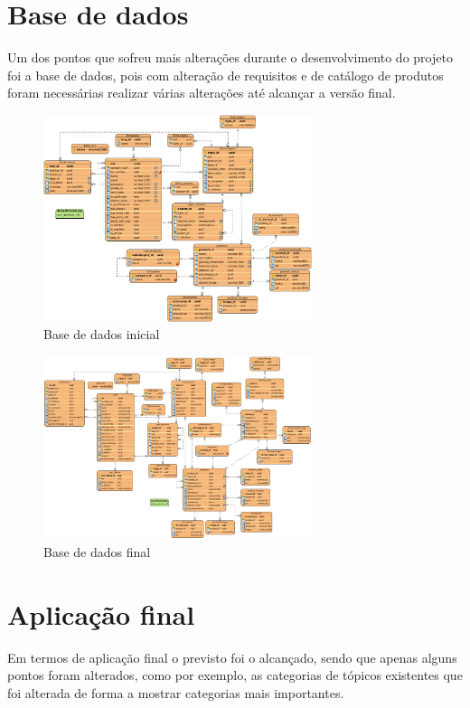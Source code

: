\section{Base de dados}

Um dos pontos que sofreu mais alterações durante o desenvolvimento do projeto foi a base de dados, pois com alteração de requisitos e de catálogo de produtos foram necessárias realizar várias alterações até alcançar a versão final.

\begin{figure}[htb]
  \centering
  \includegraphics[width=0.7\textwidth]{images/diagramas/diagrama_bd.png}
  \caption{Base de dados inicial}
  \label{fig:79}
\end{figure}

\begin{figure}[htb]
  \centering
  \includegraphics[width=0.7\textwidth]{images/diagramas/bd_final.png}
  \caption{Base de dados final}
  \label{fig:80}
\end{figure}


\section{Aplicação final}
Em termos de aplicação final o previsto foi o alcançado, sendo que apenas alguns pontos foram alterados, como por exemplo, as categorias de tópicos existentes que foi alterada de forma a mostrar categorias mais importantes.



